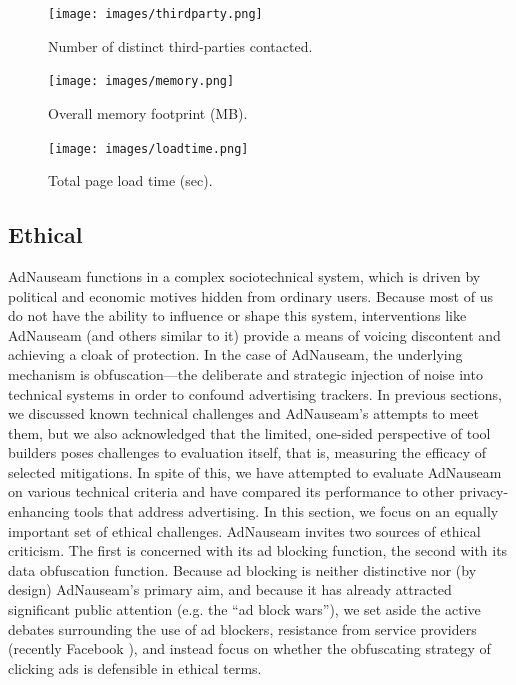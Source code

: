 \documentclass[conference]{IEEEtran}
\begin{document}
\begin{figure}[!t]
\centering
\texttt{[image: images/thirdparty.png]}
\caption{Number of distinct third-parties contacted.}
\label{fig:thirdparty}
\vspace{10mm}
\texttt{[image: images/memory.png]}
\caption{Overall memory footprint (MB).}
\label{fig:memory}
\vspace{10mm}
\texttt{[image: images/loadtime.png]}
\caption{Total page load time (sec).}
\label{fig:loadtime}
\end{figure}


\subsection{Ethical}

AdNauseam functions in a complex sociotechnical system, which is driven by political and economic motives hidden from ordinary users. Because most of us do not have the ability to influence or shape this system, interventions like AdNauseam (and others similar to it) provide a means of voicing discontent and achieving a cloak of protection. In the case of AdNauseam, the underlying mechanism is obfuscation---the deliberate and strategic injection of noise into technical systems in order to confound advertising trackers. In previous sections, we discussed known technical challenges and AdNauseam's attempts to meet them, but we also acknowledged that the limited, one-sided perspective of tool builders poses challenges to evaluation itself, that is, measuring the efficacy of selected mitigations. In spite of this, we have attempted to evaluate AdNauseam on various technical criteria and have compared its performance to other privacy-enhancing tools that address advertising. In this section, we focus on an equally important set of ethical challenges. AdNauseam invites two sources of ethical criticism. The first is concerned with its ad blocking function, the second with its data obfuscation function. Because ad blocking is neither distinctive nor (by design) AdNauseam's primary aim, and because it has already attracted significant public attention (e.g. the “ad block wars”), we set aside the active debates surrounding the use of ad blockers, resistance from service providers (recently Facebook \cite{Johnston}), and instead focus on whether the obfuscating strategy of clicking ads is defensible in ethical terms.
\end{document}
